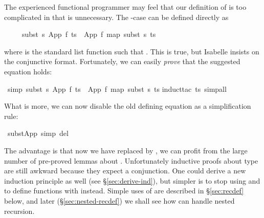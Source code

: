 \begin{isabellebody}
\begin{isamarkuptext}
The experienced functional programmer may feel that our definition of
 is too complicated in that  is
unnecessary. The -case can be defined directly as
\begin{isabelle}%
\ \ \ \ \ subst\ s\ {\isacharparenleft}App\ f\ ts{\isacharparenright}\ {\isacharequal}\ App\ f\ {\isacharparenleft}map\ {\isacharparenleft}subst\ s{\isacharparenright}\ ts{\isacharparenright}%
\end{isabelle}
where  is the standard list function such that
. This is true, but Isabelle
insists on the conjunctive format. Fortunately, we can easily \emph{prove}
that the suggested equation holds:%
\end{isamarkuptext}%
%
\isadelimproof
%
\endisadelimproof
%
\isatagproof
%
\endisatagproof
{\isafoldproof}%
%
\isadelimproof
%
\endisadelimproof
%
\isadelimproof
%
\endisadelimproof
%
\isatagproof
%
\endisatagproof
{\isafoldproof}%
%
\isadelimproof
%
\endisadelimproof
%
\isadelimproof
%
\endisadelimproof
%
\isatagproof
%
\endisatagproof
{\isafoldproof}%
%
\isadelimproof
\isanewline
%
\endisadelimproof
\isamarkupfalse%
\ {\isacharbrackleft}simp{\isacharbrackright}{\isacharcolon}\ {\isachardoublequote}subst\ s\ {\isacharparenleft}App\ f\ ts{\isacharparenright}\ {\isacharequal}\ App\ f\ {\isacharparenleft}map\ {\isacharparenleft}subst\ s{\isacharparenright}\ ts{\isacharparenright}{\isachardoublequote}\isanewline
%
\isadelimproof
%
\endisadelimproof
%
\isatagproof
\isamarkupfalse%
induct{\isacharunderscore}tac\ ts{\isacharcomma}\ simp{\isacharunderscore}all{\isacharparenright}\isanewline
\isamarkupfalse%
%
\endisatagproof
{\isafoldproof}%
%
\isadelimproof
%
\endisadelimproof
\isamarkuptrue%
%
\begin{isamarkuptext}%
\noindent
What is more, we can now disable the old defining equation as a
simplification rule:%
\end{isamarkuptext}%
\isamarkupfalse%
\ subst{\isacharunderscore}App\ {\isacharbrackleft}simp\ del{\isacharbrackright}\isamarkuptrue%
%
\begin{isamarkuptext}%
\noindent
The advantage is that now we have replaced  by
, we can profit from the large number of pre-proved lemmas
about .  Unfortunately inductive proofs about type
 are still awkward because they expect a conjunction. One
could derive a new induction principle as well (see
\S\ref{sec:derive-ind}), but simpler is to stop using 
and to define functions with  instead.
Simple uses of  are described in \S\ref{sec:recdef} below,
and later (\S\ref{sec:nested-recdef}) we shall see how  can 
handle nested recursion.


\end{isamarkuptext}
\end{isabellebody}
